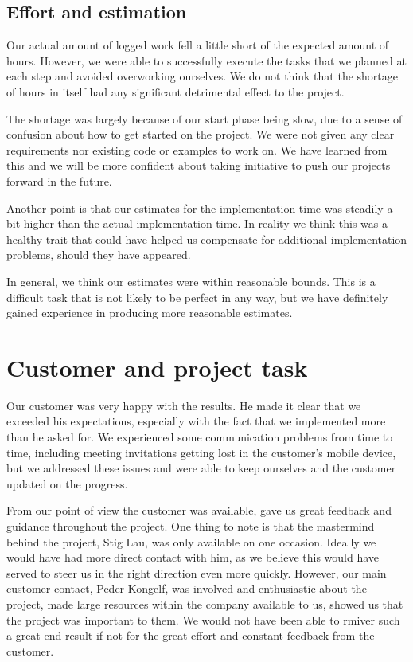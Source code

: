 \subsection*{Effort and estimation}
Our actual amount of logged work fell a little short of the expected amount of hours. However, we were able to successfully execute the tasks that we planned at each step and avoided overworking ourselves. We do not think that the shortage of hours in itself had any significant detrimental effect to the project.

The shortage was largely because of our start phase being slow, due to a sense of confusion about how to get started on the project. We were not given any clear requirements nor existing code or examples to work on. We have learned from this and we will be more confident about taking initiative to push our projects forward in the future.

Another point is that our estimates for the implementation time was steadily a bit higher than the actual implementation time. In reality we think this was a healthy trait that could have helped us compensate for additional implementation problems, should they have appeared.

In general, we think our estimates were within reasonable bounds. This is a difficult task that is not likely to be perfect in any way, but we have definitely gained experience in producing more reasonable estimates.

\section{Customer and project task}
Our customer was very happy with the results. He made it clear that we exceeded his expectations, especially with the fact that we implemented more than he asked for. We experienced some communication problems from time to time, including meeting invitations getting lost in the customer’s mobile device, but we addressed these issues and were able to keep ourselves and the customer updated on the progress.

From our point of view the customer was available, gave us great feedback and guidance throughout the project. One thing to note is that the mastermind behind the project, Stig Lau, was only available on one occasion. Ideally we would have had more direct contact with him, as we believe this would have served to steer us in the right direction even more quickly. However, our main customer contact, Peder Kongelf, was involved and enthusiastic about the project, made large resources within the company available to us, showed us that the project was important to them. We would not have been able to rmiver such a great end result if not for the great effort and constant feedback from the customer.

